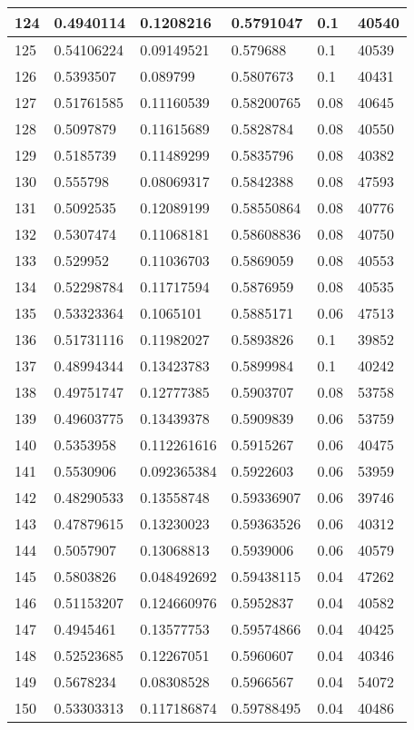 \begin{longtable}{|l|l|l|l|l|l|}
124 & 0.4940114 & 0.1208216 & 0.5791047 & 0.1 & 40540 \\ \hline 
125 & 0.54106224 & 0.09149521 & 0.579688 & 0.1 & 40539 \\ \hline 
126 & 0.5393507 & 0.089799 & 0.5807673 & 0.1 & 40431 \\ \hline 
127 & 0.51761585 & 0.11160539 & 0.58200765 & 0.08 & 40645 \\ \hline 
128 & 0.5097879 & 0.11615689 & 0.5828784 & 0.08 & 40550 \\ \hline 
129 & 0.5185739 & 0.11489299 & 0.5835796 & 0.08 & 40382 \\ \hline 
130 & 0.555798 & 0.08069317 & 0.5842388 & 0.08 & 47593 \\ \hline 
131 & 0.5092535 & 0.12089199 & 0.58550864 & 0.08 & 40776 \\ \hline 
132 & 0.5307474 & 0.11068181 & 0.58608836 & 0.08 & 40750 \\ \hline 
133 & 0.529952 & 0.11036703 & 0.5869059 & 0.08 & 40553 \\ \hline 
134 & 0.52298784 & 0.11717594 & 0.5876959 & 0.08 & 40535 \\ \hline 
135 & 0.53323364 & 0.1065101 & 0.5885171 & 0.06 & 47513 \\ \hline 
136 & 0.51731116 & 0.11982027 & 0.5893826 & 0.1 & 39852 \\ \hline 
137 & 0.48994344 & 0.13423783 & 0.5899984 & 0.1 & 40242 \\ \hline 
138 & 0.49751747 & 0.12777385 & 0.5903707 & 0.08 & 53758 \\ \hline 
139 & 0.49603775 & 0.13439378 & 0.5909839 & 0.06 & 53759 \\ \hline 
140 & 0.5353958 & 0.112261616 & 0.5915267 & 0.06 & 40475 \\ \hline 
141 & 0.5530906 & 0.092365384 & 0.5922603 & 0.06 & 53959 \\ \hline 
142 & 0.48290533 & 0.13558748 & 0.59336907 & 0.06 & 39746 \\ \hline 
143 & 0.47879615 & 0.13230023 & 0.59363526 & 0.06 & 40312 \\ \hline 
144 & 0.5057907 & 0.13068813 & 0.5939006 & 0.06 & 40579 \\ \hline 
145 & 0.5803826 & 0.048492692 & 0.59438115 & 0.04 & 47262 \\ \hline 
146 & 0.51153207 & 0.124660976 & 0.5952837 & 0.04 & 40582 \\ \hline 
147 & 0.4945461 & 0.13577753 & 0.59574866 & 0.04 & 40425 \\ \hline 
148 & 0.52523685 & 0.12267051 & 0.5960607 & 0.04 & 40346 \\ \hline 
149 & 0.5678234 & 0.08308528 & 0.5966567 & 0.04 & 54072 \\ \hline 
150 & 0.53303313 & 0.117186874 & 0.59788495 & 0.04 & 40486 \\ \hline 
\end{longtable}